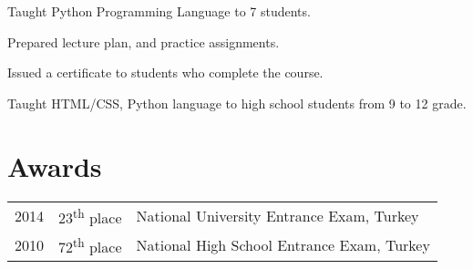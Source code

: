 \documentclass[]{deedy-resume-openfont}
\begin{document}
\begin{minipage}[t]{0.66\textwidth}
\begin{tightemize}
\item Taught Python Programming Language to 7 students.
\item Prepared lecture plan, and practice assignments.
\item Issued a certificate to students who complete the course.
\end{tightemize}
\sectionsep

\begin{tightemize}
\item Taught HTML/CSS, Python language to high school students from 9 to 12 grade.

\end{tightemize}
\sectionsep
\fi

\iffalse

\section{Research}
\runsubsection{Cornell Robot Learning Lab}
\descript{| Head Undergrad Research}
\location{Jan 2014 – Present | Ithaca, NY}
Worked with \textbf{\href{http://www.cs.cornell.edu/~ashesh/}{Ashesh Jain}} and \textbf{\href{http://www.cs.cornell.edu/~asaxena/}{Prof Ashutosh Saxena}} to create \textbf{PlanIt}, a tool which  learns from large scale user preference feedback to plan robot trajectories in human environments.  Publication submitted.
\sectionsep

\runsubsection{Cornell Phonetics Lab}
\descript{| Head Undergraduate Researcher}
\location{Mar 2012 – May 2013 | Ithaca, NY}
Lead the development of \textbf{QuickTongue}, the first ever breakthrough tongue-controlled game with \textbf{\href{http://conf.ling.cornell.edu/~tilsen/}{Prof Sam Tilsen}} to aid in Linguistics research. Publication submitted.
\sectionsep
\fi

\iftrue

\section{Awards} 
\begin{tabular}{rll}
2014	     & 23\textsuperscript{th} place  & National University Entrance Exam, Turkey\\
2010	     & 72\textsuperscript{th} place  & National High School Entrance Exam, Turkey\\
\end{tabular}
\sectionsep
\fi



\end{minipage}
\end{document}
